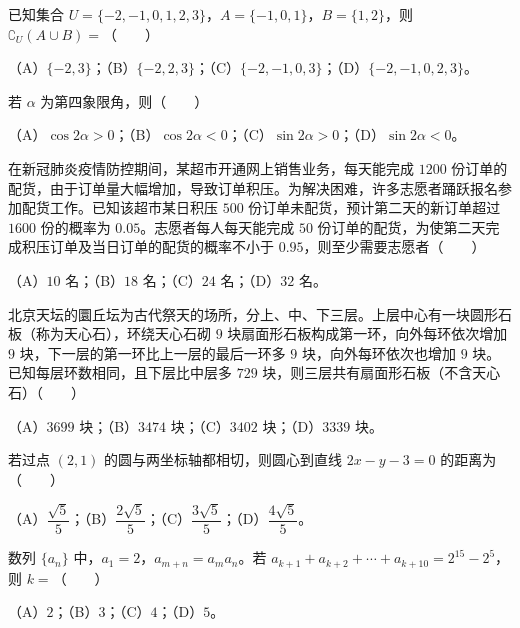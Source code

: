 \begin{question}
已知集合 $U=\{-2,-1,0,1,2,3\}$，$A=\{-1,0,1\}$，$B=\{1,2\}$，则 $\complement_U(A\cup B)=$\mbox{（　　）}

（A）$\{-2,3\}$；（B）$\{-2,2,3\}$；（C）$\{-2,-1,0,3\}$；（D）$\{-2,-1,0,2,3\}$。

\end{question}
\begin{question}
若 $\alpha$ 为第四象限角，则\mbox{（　　）}

（A）$\cos2\alpha>0$；（B）$\cos2\alpha<0$；（C）$\sin2\alpha>0$；（D）$\sin2\alpha<0$。

\end{question}
\begin{question}
在新冠肺炎疫情防控期间，某超市开通网上销售业务，每天能完成 $1200$ 份订单的配货，由于订单量大幅增加，导致订单积压。为解决困难，许多志愿者踊跃报名参加配货工作。已知该超市某日积压 $500$ 份订单未配货，预计第二天的新订单超过 $1600$ 份的概率为 $0.05$。志愿者每人每天能完成 $50$ 份订单的配货，为使第二天完成积压订单及当日订单的配货的概率不小于 $0.95$，则至少需要志愿者\mbox{（　　）}

（A）$10$ 名；（B）$18$ 名；（C）$24$ 名；（D）$32$ 名。

\end{question}
\begin{question}
北京天坛的圜丘坛为古代祭天的场所，分上、中、下三层。上层中心有一块圆形石板（称为天心石），环绕天心石砌 $9$ 块扇面形石板构成第一环，向外每环依次增加 $9$ 块，下一层的第一环比上一层的最后一环多 $9$ 块，向外每环依次也增加 $9$ 块。已知每层环数相同，且下层比中层多 $729$ 块，则三层共有扇面形石板（不含天心石）\mbox{（　　）}

（A）$3699$ 块；（B）$3474$ 块；（C）$3402$ 块；（D）$3339$ 块。

\end{question}
\begin{question}
若过点 $(2,1)$ 的圆与两坐标轴都相切，则圆心到直线 $2x-y-3=0$ 的距离为\mbox{（　　）}

（A）$\dfrac{\sqrt5}5$；（B）$\dfrac{2\sqrt5}5$；（C）$\dfrac{3\sqrt5}5$；（D）$\dfrac{4\sqrt5}5$。

\end{question}
\begin{question}
数列 $\{a_n\}$ 中，$a_1=2$，$a_{m+n}=a_ma_n$。若 $a_{k+1}+a_{k+2}+\cdots+a_{k+10}=2^{15}-2^5$，则 $k=$\mbox{（　　）}

（A）$2$；（B）$3$；（C）$4$；（D）$5$。

\Needspace{0.4\textheight}
\end{question}
